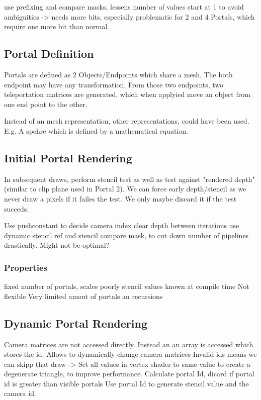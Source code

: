 use prefixing and compare masks, lessens number of values
start at 1 to avoid ambiguities -> needs more bits, especially problematic for 2 and 4 Portals, which require one more bit than normal.


\subsection{Portal Definition}
Portals are defined as 2 Objects/Endpoints which share a mesh. The both endpoint may have any transformation. From those two endpoints, two teleportation matrices are generated, which when applyied move an object from one end point to the other.

Instead of an mesh representation, other representations, could have been used. E.g. A spehre which is defined by a mathematical equation.

\subsection{Initial Portal Rendering}
In subsequent draws, perform stencil test as well as test against "rendered depth" (similar to clip plane used in Portal 2).
We can force early depth/stencil as we never draw a pixels if it failes the test. We only maybe discard it if the test succeds.

Use pushconstant to decide camera index
clear depth between iterations
use dynamic stencil ref and stencil compare mask, to cut down number of pipelines drastically. Might not be optimal?


\subsubsection{Properties}
fixed number of portals, scales poorly
stencil values known at compile time
Not flexible
Very limited amout of portals an recursions

\subsection{Dynamic Portal Rendering}
Camera matrices are not accessed directly. Instead an an array is accessed which stores the id. Allows to dynamically change camera matrices
Invalid ids means we can skipp that draw -> Set all values in vertex shader to same value to create a degenerate triangle, to improve performance.
Calculate portal Id, dicard if portal id is greater than visible portals
Use portal Id to generate stencil value and the camera id.


